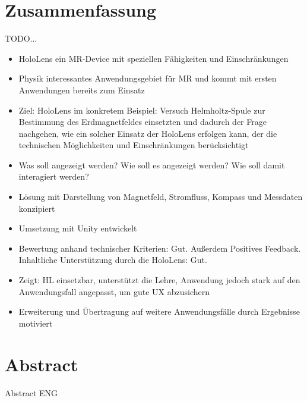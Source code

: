 \section*{Zusammenfassung}
TODO...
\begin{itemize}
	\item HoloLens ein MR-Device mit speziellen Fähigkeiten und Einschränkungen
	\item Physik interessantes Anwendungsgebiet für MR und kommt mit ersten Anwendungen bereits zum Einsatz
	\item Ziel: HoloLens im konkretem Beispiel: Versuch Helmholtz-Spule zur Bestimmung des Erdmagnetfeldes einsetzten und dadurch der Frage nachgehen, wie ein solcher Einsatz der HoloLens erfolgen kann, der die technischen Möglichkeiten und Einschränkungen berücksichtigt
	\item Was soll angezeigt werden? Wie soll es angezeigt werden? Wie soll damit interagiert werden?
	\item Lösung mit Darstellung von Magnetfeld, Stromfluss, Kompass und Messdaten konzipiert
	\item Umsetzung mit Unity entwickelt
	\item Bewertung anhand technischer Kriterien: Gut. Außerdem Positives Feedback. Inhaltliche Unterstützung durch die HoloLens: Gut.
	\item Zeigt: HL einsetzbar, unterstützt die Lehre, Anwendung jedoch stark auf den Anwendungsfall angepasst, um gute UX abzusichern
	\item Erweiterung und Übertragung auf weitere Anwendungsfälle durch Ergebnisse motiviert
\end{itemize}

\section*{Abstract}
Abstract ENG